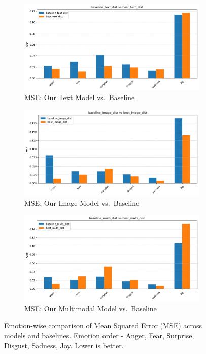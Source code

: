\begin{figure}[ht]
    \centering
    \begin{subfigure}[b]{0.48\textwidth}
        \includegraphics[width=\textwidth]{images/plot_1.png}
        \caption{MSE: Our Text Model vs.\ Baseline}
        \label{fig:mse-text}
    \end{subfigure}
    \hfill
    \begin{subfigure}[b]{0.48\textwidth}
        \includegraphics[width=\textwidth]{images/plot_2.png}
        \caption{MSE: Our Image Model vs.\ Baseline}
        \label{fig:mse-img}
    \end{subfigure}
    \begin{subfigure}[b]{0.48\textwidth}
        \includegraphics[width=\textwidth]{images/plot_3.png}
        \caption{MSE: Our Multimodal Model vs.\ Baseline}
        \label{fig:mse-multi}
    \end{subfigure}
    \caption{Emotion-wise comparison of Mean Squared Error (MSE) across models and baselines. Emotion order - Anger, Fear, Surprise, Disgust, Sadness, Joy. Lower is better.}
    \label{fig:mse-all}
\end{figure}

